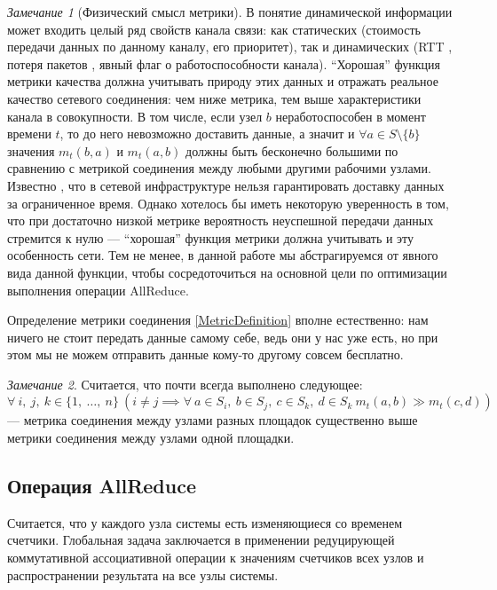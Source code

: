 \documentclass{article}
\theoremstyle{plain}
\theoremstyle{plain}
\theoremstyle{plain}
\theoremstyle{plain}
\theoremstyle{definition}
\theoremstyle{remark}
\newtheorem{remark}{Замечание}[section]
\theoremstyle{plain}
\begin{document}
\begin{remark}[Физический смысл метрики]
\label{MetricPhysicalMeaning}
    В понятие динамической информации может входить целый ряд свойств канала связи: как статических (стоимость передачи данных по данному каналу, его приоритет), так и динамических (RTT \cite{definition:round-trip_delay_time}, потеря пакетов \cite{RFC1242}, явный флаг о работоспособности канала). \enquote{Хорошая} функция метрики качества должна учитывать природу этих данных и отражать реальное качество сетевого соединения: чем ниже метрика, тем выше характеристики канала в совокупности. В том числе, если узел $b$ неработоспособен в момент времени $t$, то до него невозможно доставить данные, а значит и $\forall a \in S \setminus \{ b \}$ значения $m_t(b, a)$ и $m_t(a, b)$ должны быть бесконечно большими по сравнению с метрикой соединения между любыми другими рабочими узлами. Известно \cite{networking:best-effort-service}, что в сетевой инфраструктуре нельзя гарантировать доставку данных за ограниченное время. Однако хотелось бы иметь некоторую уверенность в том, что при достаточно низкой метрике вероятность неуспешной передачи данных стремится к нулю --- \enquote{хорошая} функция метрики должна учитывать и эту особенность сети. Тем не менее, в данной работе мы абстрагируемся от явного вида данной функции, чтобы сосредоточиться на основной цели по оптимизации выполнения операции AllReduce.
\end{remark}

Определение метрики соединения \ref{MetricDefinition} вполне естественно: нам ничего не стоит передать данные самому себе, ведь они у нас уже есть, но при этом мы не можем отправить данные кому-то другому совсем бесплатно.

\begin{remark}
\label{MetricEmpiricalRule}
    Считается, что почти всегда выполнено следующее: 
    \[
        \forall\ i,\ j,\ k \in \{1,\ \ldots,\ n\}\ ( i \neq j \implies \forall\ a \in S_i,\ b \in S_j,\ c \in S_k,\ d \in S_k\ m_t(a, b) \gg m_t(c, d))
    \] --- метрика соединения между узлами разных площадок существенно выше метрики соединения между узлами одной площадки.
\end{remark}

\subsection{Операция AllReduce}

Считается, что у каждого узла системы есть изменяющиеся со временем счетчики. Глобальная задача заключается в применении редуцирующей коммутативной ассоциативной операции к значениям счетчиков всех узлов и распространении результата на все узлы системы.
\end{document}
